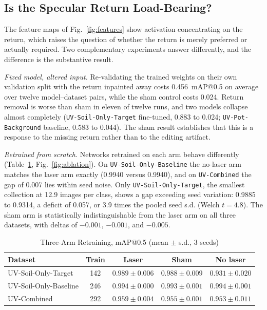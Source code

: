 ﻿\documentclass[journal]{IEEEtran}
\begin{document}
\subsection{Is the Specular Return Load-Bearing?}
\label{sec:ablation-results}
The feature maps of Fig.~\ref{fig:features} show activation concentrating on the return, which raises the question of whether the return is merely preferred or actually required. Two complementary experiments answer differently, and the difference is the substantive result.

\emph{Fixed model, altered input.} Re-validating the trained weights on their own validation split with the return inpainted away costs 0.456~mAP@0.5 on average over twelve model--dataset pairs, while the sham control costs 0.024. Return removal is worse than sham in eleven of twelve runs, and two models collapse almost completely (\texttt{UV-Soil-Only-Target} fine-tuned, 0.883 to 0.024; \texttt{UV-Pot-Background} baseline, 0.583 to 0.044). The sham result establishes that this is a response to the missing return rather than to the editing artifact.

\emph{Retrained from scratch.} Networks retrained on each arm behave differently (Table~\ref{tab:ablation}, Fig.~\ref{fig:ablation}). On \texttt{UV-Soil-Only-Baseline} the no-laser arm matches the laser arm exactly (0.9940 versus 0.9940), and on \texttt{UV-Combined} the gap of 0.007 lies within seed noise. Only \texttt{UV-Soil-Only-Target}, the smallest collection at 12.9 images per class, shows a gap exceeding seed variation: 0.9885 to 0.9314, a deficit of 0.057, or 3.9 times the pooled seed s.d. (Welch $t = 4.8$). The sham arm is statistically indistinguishable from the laser arm on all three datasets, with deltas of $-0.001$, $-0.001$, and $-0.005$.

\begin{table}[!t]
\renewcommand{\arraystretch}{1.3}
\caption{Three-Arm Retraining, mAP@0.5 (mean $\pm$ s.d., 3 seeds)}
\label{tab:ablation}
\centering
\scriptsize
\setlength{\tabcolsep}{3pt}
\begin{tabular}{l c c c c}
\toprule
\textbf{Dataset} & \textbf{Train} & \textbf{Laser} & \textbf{Sham} & \textbf{No laser} \\
\midrule
UV-Soil-Only-Target & 142 & $0.989 \pm 0.006$ & $0.988 \pm 0.009$ & $0.931 \pm 0.020$ \\
UV-Soil-Only-Baseline & 246 & $0.994 \pm 0.000$ & $0.993 \pm 0.001$ & $0.994 \pm 0.001$ \\
UV-Combined & 292 & $0.959 \pm 0.004$ & $0.955 \pm 0.001$ & $0.953 \pm 0.011$ \\
\bottomrule
\end{tabular}
\end{table}
\end{document}
